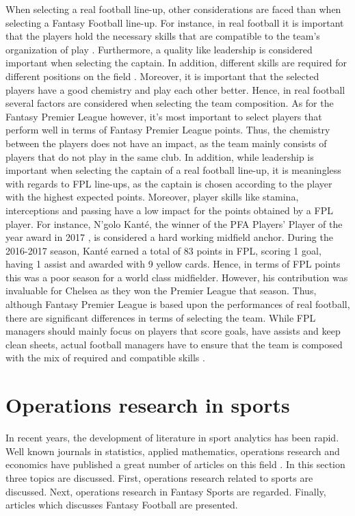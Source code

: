 When selecting a real football line-up, other considerations are faced than when selecting a Fantasy Football line-up. For instance, in real football it is important that the players hold the necessary skills that are compatible to the team's organization of play \citep{Pantuso}. Furthermore, a quality like leadership is considered important when selecting the captain. In addition, different skills are required for different positions on the field \citep{Boon}. Moreover, it is important that the selected players have a good chemistry and play each other better. Hence, in real football several factors are considered when selecting the team composition. As for the Fantasy Premier League however, it's most important to select players that perform well in terms of Fantasy Premier League points. Thus, the chemistry between the players does not have an impact, as the team mainly consists of players that do not play in the same club. In addition, while leadership is important when selecting the captain of a real football line-up, it is meaningless with regards to FPL line-ups, as the captain is chosen according to the player with the highest expected points. Moreover, player skills like stamina, interceptions and passing have a low impact for the points obtained by a FPL player. For instance, N'golo Kant\'e, the winner of the PFA Players' Player of the year award in 2017 \citep{Skysports_Kante}, is considered a hard working midfield anchor. During the 2016-2017 season, Kant\'e earned a total of 83 points in FPL, scoring 1 goal, having 1 assist and awarded with 9 yellow cards. Hence, in terms of FPL points this was a poor season for a world class midfielder. However, his contribution was invaluable for Chelsea as they won the Premier League that season. Thus, although Fantasy Premier League is based upon the performances of real football, there are significant differences in terms of selecting the team. While FPL managers should mainly focus on players that score goals, have assists and keep clean sheets, actual football managers have to ensure that the team is composed with the mix of required and compatible skills \citep{Pantuso}.



\section{Operations research in sports} \label{Opt_Models_for_Fantasy_Sports}


In recent years, the development of literature in sport analytics has been rapid. Well known journals in statistics, applied mathematics, operations research and economics have published a great number of articles on this field \citep{Coleman}. In this section three topics are discussed. First, operations research related to sports are discussed. Next, operations research in Fantasy Sports are regarded. Finally, articles which discusses Fantasy Football are presented. 

